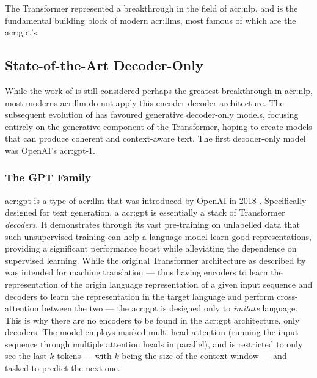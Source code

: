 The Transformer represented a breakthrough in the field of \gls{acr:nlp}, and is the fundamental building block of modern \glspl{acr:llm}, most famous of which are the \acrshort{acr:gpt}'s.


\subsection[State-of-the-Art Decoder-Only Models]{State-of-the-Art Decoder-Only }
\label{subsec:sota-decoder-only-llms}

While the work of \citeauthor{vaswaniAttentionAllYou2017} is still considered perhaps the greatest breakthrough in \gls{acr:nlp}, most moderns \acrshort{acr:llm} do not apply this encoder-decoder architecture. The subsequent evolution of  has favoured generative decoder-only models, focusing entirely on the generative component of the Transformer, hoping to create models that can produce coherent and context-aware text. The first decoder-only model was OpenAI's \acrshort{acr:gpt}-1.

\subsubsection{The GPT Family}
\label{subusubsec:gpt}

\gls{acr:gpt} is a type of \gls{acr:llm} that was introduced by OpenAI in 2018 \citep{radfordImprovingLanguageUnderstanding2018}. Specifically designed for text generation, a \acrshort{acr:gpt} is essentially a stack of Transformer \textit{decoders}. It demonstrates through its vast pre-training on unlabelled data that such unsupervised training can help a language model learn good representations, providing a significant performance boost while alleviating the dependence on supervised learning. While the original Transformer architecture as described by \cite{vaswaniAttentionAllYou2017} was intended for machine translation --- thus having encoders to learn the representation of the origin language representation of a given input sequence and decoders to learn the representation in the target language and perform cross-attention between the two --- the \acrshort{acr:gpt} is designed only to \textit{imitate} language. This is why there are no encoders to be found in the \acrshort{acr:gpt} architecture, only decoders. The model employs masked multi-head attention (running the input sequence through multiple attention heads in parallel), and is restricted to only see the last $k$ tokens --- with $k$ being the size of the context window --- and tasked to predict the next one.

